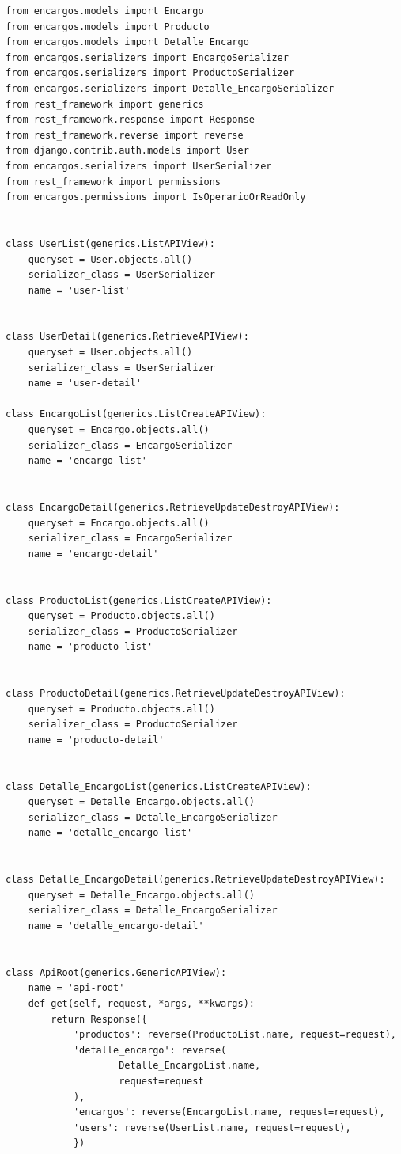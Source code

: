 \documentclass[11pt,twoside]{book}
\begin{document}
\begin{verbatim}
from encargos.models import Encargo
from encargos.models import Producto
from encargos.models import Detalle_Encargo
from encargos.serializers import EncargoSerializer
from encargos.serializers import ProductoSerializer
from encargos.serializers import Detalle_EncargoSerializer
from rest_framework import generics
from rest_framework.response import Response
from rest_framework.reverse import reverse
from django.contrib.auth.models import User
from encargos.serializers import UserSerializer
from rest_framework import permissions
from encargos.permissions import IsOperarioOrReadOnly


class UserList(generics.ListAPIView):
    queryset = User.objects.all()
    serializer_class = UserSerializer
    name = 'user-list'


class UserDetail(generics.RetrieveAPIView):
    queryset = User.objects.all()
    serializer_class = UserSerializer
    name = 'user-detail'

class EncargoList(generics.ListCreateAPIView):
    queryset = Encargo.objects.all()
    serializer_class = EncargoSerializer
    name = 'encargo-list'


class EncargoDetail(generics.RetrieveUpdateDestroyAPIView):
    queryset = Encargo.objects.all()
    serializer_class = EncargoSerializer
    name = 'encargo-detail'


class ProductoList(generics.ListCreateAPIView):
    queryset = Producto.objects.all()
    serializer_class = ProductoSerializer
    name = 'producto-list'


class ProductoDetail(generics.RetrieveUpdateDestroyAPIView):
    queryset = Producto.objects.all()
    serializer_class = ProductoSerializer
    name = 'producto-detail'
    

class Detalle_EncargoList(generics.ListCreateAPIView):
    queryset = Detalle_Encargo.objects.all()
    serializer_class = Detalle_EncargoSerializer
    name = 'detalle_encargo-list'


class Detalle_EncargoDetail(generics.RetrieveUpdateDestroyAPIView):
    queryset = Detalle_Encargo.objects.all()
    serializer_class = Detalle_EncargoSerializer
    name = 'detalle_encargo-detail'
    

class ApiRoot(generics.GenericAPIView):
    name = 'api-root'
    def get(self, request, *args, **kwargs):
        return Response({
            'productos': reverse(ProductoList.name, request=request),
            'detalle_encargo': reverse(
                    Detalle_EncargoList.name, 
                    request=request
            ),
            'encargos': reverse(EncargoList.name, request=request),
            'users': reverse(UserList.name, request=request),
            })
\end{verbatim}
\end{document}
